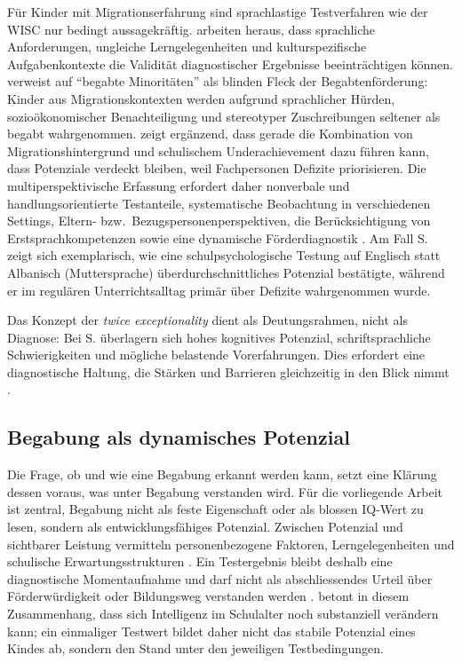\documentclass[ngerman, a4paper]{article}
\begin{document}
Für Kinder mit Migrationserfahrung sind sprachlastige Testverfahren
wie der WISC nur bedingt aussagekräftig.
\textcite[S.\,153--165,\,187\,f.]{haag2018leistungsstanddiagnostik}
arbeiten heraus, dass sprachliche Anforderungen, ungleiche
Lerngelegenheiten und kulturspezifische Aufgabenkontexte die Validität
diagnostischer Ergebnisse beeinträchtigen können.
\textcite[S.\,576--585]{stamm2021fehlenderblick} verweist auf
\enquote{begabte Minoritäten} als blinden Fleck der Begabtenförderung:
Kinder aus Migrationskontexten werden aufgrund sprachlicher Hürden,
sozioökonomischer Benachteiligung und stereotyper Zuschreibungen
seltener als begabt wahrgenommen.
\textcite[S.\,76--78]{kellerkoller2025hellekoepfe} zeigt ergänzend,
dass gerade die Kombination von Migrationshintergrund und schulischem
Underachievement dazu führen kann, dass Potenziale verdeckt bleiben,
weil Fachpersonen Defizite priorisieren. Die multiperspektivische
Erfassung erfordert daher nonverbale und handlungsorientierte
Testanteile, systematische Beobachtung in verschiedenen Settings,
Eltern- bzw.\ Bezugspersonenperspektiven, die Berücksichtigung von
Erstsprachkompetenzen sowie eine dynamische Förderdiagnostik
\parencite[S.\,224--235]{muelleroppliger2021paeddiagnostik}.
Am Fall S. zeigt sich exemplarisch, wie eine schulpsychologische Testung auf Englisch
statt Albanisch (Muttersprache) überdurchschnittliches Potenzial bestätigte,
während er im regulären
Unterrichtsalltag primär über Defizite wahrgenommen wurde.

Das Konzept der \textit{twice exceptionality} dient als Deutungsrahmen,
nicht als Diagnose: Bei S. überlagern sich hohes kognitives Potenzial,
schriftsprachliche Schwierigkeiten und mögliche belastende Vorerfahrungen.
Dies erfordert eine diagnostische Haltung, die Stärken und Barrieren
gleichzeitig in den Blick nimmt
\parencite[S.\,588--598]{baumschader2021twice}.


\subsection{Begabung als dynamisches Potenzial}

Die Frage, ob und wie eine Begabung erkannt werden kann, setzt eine
Klärung dessen voraus, was unter Begabung verstanden wird. Für die
vorliegende Arbeit ist zentral, Begabung nicht als feste Eigenschaft
oder als blossen IQ-Wert zu lesen, sondern als entwicklungsfähiges
Potenzial. Zwischen Potenzial und sichtbarer Leistung vermitteln
personenbezogene Faktoren, Lerngelegenheiten und schulische
Erwartungsstrukturen \parencite[S.\,204--219]{muelleroppliger2021begabungsmodelle}.
Ein Testergebnis bleibt deshalb eine diagnostische Momentaufnahme und
darf nicht als abschliessendes Urteil über Förderwürdigkeit oder
Bildungsweg verstanden werden
\parencites[S.\,115--118]{baudson2021wasdenken}[S.\,15--18]{stern2025intelligenz}.
\textcite[S.\,16]{stern2025intelligenz} betont in diesem Zusammenhang,
dass sich Intelligenz im Schulalter noch substanziell verändern kann;
ein einmaliger Testwert bildet daher nicht das stabile Potenzial eines
Kindes ab, sondern den Stand unter den jeweiligen Testbedingungen.
\end{document}
